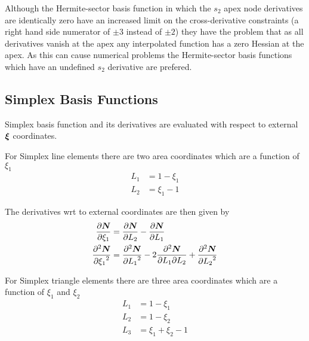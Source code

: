 Although the Hermite-sector basis function in which the $s_{2}$ apex node
derivatives are identically zero have an increased limit on the
cross-derivative constraints (a right hand side numerator of $\pm 3$ instead
of $\pm 2$) they have the problem that as all derivatives vanish at the apex
any interpolated function has a zero Hessian at the apex. As this can cause
numerical problems the Hermite-sector basis functions which have an undefined
$s_{2}$ derivative are prefered.


\subsection{Simplex Basis Functions}

Simplex basis function and its derivatives are evaluated with respect to external $\vect{\xi}$ coordinates.



For Simplex line elements there are two area coordinates which are a function of $\xi_{1}$ \ie
\begin{align}
  L_{1} &= 1 - \xi_{1} \\
  L_{2} &= \xi_{1} - 1
\end{align}

The derivatives wrt to external coordinates are then given by 
\begin{align}
  \delby{\vect{\sbfnsymb{}}}{\xi_{1}} &= \delby{\vect{\sbfnsymb{}}}{L_{2}}-\delby{\vect{\sbfnsymb{}}}{L_{1}} \\
  \deltwosqby{\vect{\sbfnsymb{}}}{\xi_{1}} &= \deltwosqby{\vect{\sbfnsymb{}}}{L_{1}}-
  2\deltwoby{\vect{\sbfnsymb{}}}{L_{1}}{L_{2}}+\deltwosqby{\vect{\sbfnsymb{}}}{L_{2}}
\end{align}

For Simplex triangle elements there are three area coordinates which are a function of $\xi_{1}$ and
$\xi_{2}$ \ie
\begin{align} 
  L_{1} &= 1 - \xi_{1} \\
  L_{2} &= 1 - \xi_{2} \\
  L_{3} &= \xi_{1} + \xi_{2} - 1 
\end{align}

